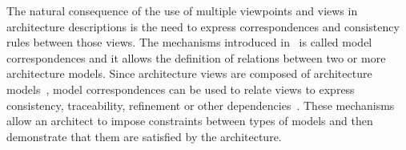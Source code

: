 


The natural consequence of the use of multiple viewpoints and views in architecture
descriptions is the need to express correspondences and consistency rules between those views.
The mechanisms introduced in~\cite{42010} is called model correspondences and it allows the definition of relations between
two or more architecture models. Since architecture views are composed of architecture models~\cite{42010}, model correspondences can be used to
relate views to express consistency, traceability, refinement or other dependencies~\cite{Emery-Hilliard:2009}.
These mechanisms allow an architect to impose constraints between types of models and then demonstrate that them
are satisfied by the architecture. 






%
%
%





